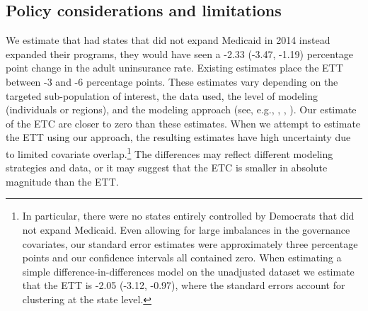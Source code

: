 \documentclass[aoas]{imsart}
\theoremstyle{plain}
\theoremstyle{remark}
\begin{document}

\subsection{Policy considerations and limitations}

We estimate that had states that did not expand Medicaid in 2014 instead expanded their programs, they would have seen a -2.33 (-3.47, -1.19) percentage point change in the adult uninsurance rate. Existing estimates place the ETT between -3 and -6 percentage points. These estimates vary depending on the targeted sub-population of interest, the data used, the level of modeling (individuals or regions), and the modeling approach (see, e.g., \cite{courtemanche2017early}, \cite{kaestner2017effects}, \cite{frean2017premium}). Our estimate of the ETC are closer to zero than these estimates. When we attempt to estimate the ETT using our approach, the resulting estimates have high uncertainty due to limited covariate overlap.\footnote{In particular, there were no states entirely controlled by Democrats that did not expand Medicaid. Even allowing for large imbalances in the governance covariates, our standard error estimates were approximately three percentage points and our confidence intervals all contained zero. When estimating a simple difference-in-differences model on the unadjusted dataset we estimate that the ETT is -2.05 (-3.12, -0.97), where the standard errors account for clustering at the state level.} The differences may reflect different modeling strategies and data, or it may suggest that the ETC is smaller in absolute magnitude than the ETT.
\end{document}
